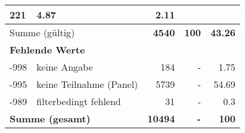 \begin{longtable}{lXrrr}
       \num{221} &
       \num[round-mode=places,round-precision=2]{4,87} &
         \num[round-mode=places,round-precision=2]{2,11} \\
     \midrule
     \multicolumn{2}{l}{Summe (gültig)} &
       \textbf{\num{4540}} &
     \textbf{100} &
       \textbf{\num[round-mode=places,round-precision=2]{43,26}} \\
     \multicolumn{5}{l}{\textbf{Fehlende Werte}}\\
       -998 &
       keine Angabe &
         \num{184} &
        - &
         \num[round-mode=places,round-precision=2]{1,75} \\
       -995 &
       keine Teilnahme (Panel) &
         \num{5739} &
        - &
         \num[round-mode=places,round-precision=2]{54,69} \\
       -989 &
       filterbedingt fehlend &
         \num{31} &
        - &
         \num[round-mode=places,round-precision=2]{0,3} \\
     \midrule
     \multicolumn{2}{l}{\textbf{Summe (gesamt)}} &
          \textbf{\num{10494}} &
        \textbf{-} &
        \textbf{100} \\
     \bottomrule
     \end{longtable}
     
